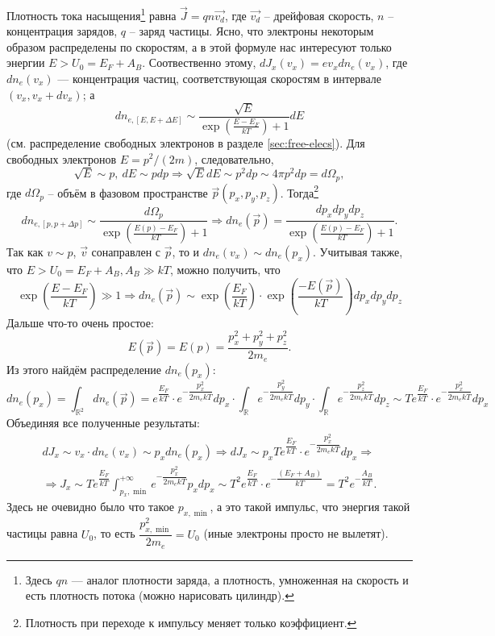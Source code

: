 Плотность тока насыщения\footnote{Здесь $ qn $ --- аналог плотности заряда, а
плотность, умноженная на скорость и есть плотность потока (можно нарисовать
цилиндр).} равна $\vec{J} = q n \vec{v_d} $, где $\vec{v_d} $ -- дрейфовая скорость, 
$n$ -- концентрация зарядов, $q$ -- заряд частицы. Ясно, что электроны некоторым образом
распределены по скоростям, а в этой формуле нас интересуют только энергии
$E > U_0 = E_F + A_B$. Соотвественно этому, $d J_x(v_x) = e v_x dn_e (v_x)$, где
$ dn_e(v_x) $ --- концентрация частиц, соответствующая скоростям в интервале $
(v_x, v_x + dv_x) $; а
\[
  dn_{e, [E, E+\Delta E]} \sim
  \dfrac{\sqrt{E}}{\exp\left(\frac{E-E_F}{kT}\right) +
  1} dE
\]
(см.
распределение свободных электронов в разделе \ref{sec:free-elecs}). Для
свободных электронов $E = p^2/(2m)$,
следовательно,
\[
  \sqrt{E} \sim p, \ dE \sim p dp \Rightarrow \sqrt{E} dE \sim p^2 dp \sim 4\pi p^2 dp = d \Omega_p,
\]
где $d\Omega_p$ -- объём в фазовом пространстве $\vec{p} (p_x, p_y, p_z)$.
Тогда\footnote{Плотность при переходе к импульсу меняет только коэффициент.}
\[
  dn_{e, [p, p+\Delta p]} \sim \dfrac{d\Omega_p}{\exp\left(\frac{E(p) -
  E_F}{kT}\right) + 1}
\Rightarrow
dn_e (\vec{p}) = \dfrac{dp_x dp_y dp_z}{\exp\left(\frac{E(p) - E_F}{kT}\right) +
1}.
\]
Так как $v \sim p$, $\vec{v}$ сонаправлен с $\vec{p}$, то и $dn_e (v_x) \sim dn_e(p_x)$.
Учитывая также, что $E > U_0 = E_F + A_B, A_B \gg kT$, 
можно получить, что 
\[
  \exp\left(\dfrac{E-E_F}{kT}\right) \gg 1
  \Rightarrow
  dn_e (\vec{p}) \sim \exp\left(\dfrac{E_F}{kT}\right) \cdot \exp\left(\dfrac{-
  E(\vec{p})}{kT}\right) dp_x dp_y dp_z
\]
Дальше что-то очень простое:
\[
  E(\vec{p}) = E(p) = \dfrac{p_x^2 + p_y^2 + p_z^2}{2m_e}.
\]
Из этого найдём распределение $dn_e (p_x)$:
\[
  dn_e (p_x) = \int_{\mathbb R^2} dn_e (\vec{p}) = e^{\dfrac{E_F}{kT}} \cdot 
  e^{- \dfrac{p_x^2}{2m_e kT}} dp_x \cdot 
  \int_\mathbb{R} e^{- \dfrac{p_y^2}{2m_e kT}} dp_y \cdot 
  \int_\mathbb{R} e^{- \dfrac{p_z^2}{2m_e kT}} dp_z
  \sim T e^{\dfrac{E_F}{kT}} \cdot e^{-\dfrac{p_x^2}{2m_e kT}} dp_x
\]
Объединяя все полученные результаты:
\begin{multline*}
  dJ_x \sim v_x \cdot dn_e (v_x) \sim p_x dn_e (p_x)
  \Rightarrow
  dJ_x \sim p_x T e^{\dfrac{E_F}{kT}} \cdot e^{-\dfrac{p_x^2}{2m_e kT}} dp_x
  \Rightarrow \\
  \Rightarrow
  J_x \sim T e^{\dfrac{E_F}{kT}} \int_{p_x, \min}^{+\infty} e^{-\dfrac{p_x^2}{2m_e kT}} p_x dp_x
  \sim T^2 e^{\dfrac{E_F}{kT}} \cdot e^{-\dfrac{(E_F + A_B)}{kT}}
  = T^2 e^{- \dfrac{A_B}{kT}}.
\end{multline*}
Здесь не очевидно было что такое $p_{x, \min}$, а это такой импульс, что энергия такой частицы
равна $U_0$, то есть $\dfrac{p_{x, \min}^2}{2m_e} = U_0$ (иные электроны просто
не вылетят).
